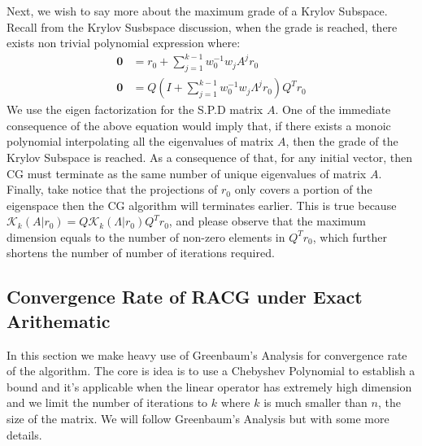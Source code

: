 \documentclass[]{article}
\theoremstyle{definition}
\begin{document}
        \par
        Next, we wish to say more about the maximum grade of a Krylov Subspace. Recall from the Krylov Susbspace discussion, when the grade is reached, there exists non trivial polynomial expression where: 
        $$
        \begin{aligned}
            \mathbf 0 &= r_0 + \sum_{j = 1}^{k - 1}w_0^{-1}w_jA^jr_0
            \\
            \mathbf 0 &= Q\left(
                I + \sum_{j = 1}^{k - 1}w^{-1}_0w_j\Lambda^jr_0
            \right)Q^Tr_0 
        \end{aligned}
        $$
        We use the eigen factorization for the S.P.D matrix $A$. One of the immediate consequence of the above equation would imply that, if there exists a monoic polynomial interpolating all the eigenvalues of matrix $A$, then the grade of the Krylov Subspace is reached. As a consequence of that, for any initial vector, then CG must terminate as the same number of unique eigenvalues of matrix $A$. Finally, take notice that the projections of $r_0$ only covers a portion of the eigenspace then the CG algorithm will terminates earlier. This is true because $\mathcal K_k(A|r_0) = Q\mathcal K_k(\Lambda| r_0)Q^Tr_0$, and please observe that the maximum dimension equals to the number of non-zero elements in $Q^Tr_0$, which further shortens the number of number of iterations required. 

    \subsection{Convergence Rate of RACG under Exact Arithematic}
        In this section we make heavy use of Greenbaum's Analysis for convergence rate of the algorithm. The core is idea is to use a Chebyshev Polynomial to establish a bound and it's applicable when the linear operator has extremely high dimension and we limit the number of iterations to $k$ where $k$ is much smaller than $n$, the size of the matrix. We will follow Greenbaum's Analysis but with some more details. 
\end{document}
